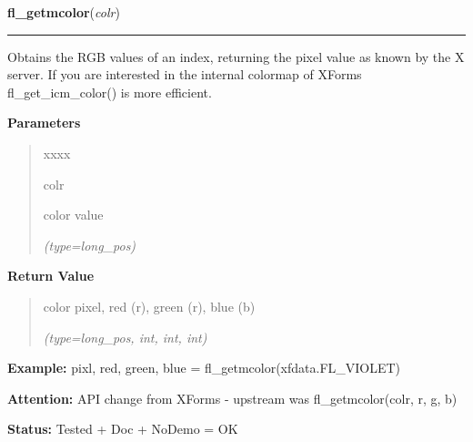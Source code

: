 \hspace{.8\funcindent}\begin{boxedminipage}{\funcwidth}

    \raggedright \textbf{fl\_getmcolor}(\textit{colr})

    \vspace{-1.5ex}

    \rule{\textwidth}{0.5\fboxrule}
\setlength{\parskip}{2ex}
    Obtains the RGB values of an index, returning the pixel value as known 
    by the X server. If you are interested in the internal colormap of 
    XForms fl\_get\_icm\_color() is more efficient.

\setlength{\parskip}{1ex}
      \textbf{Parameters}
      \vspace{-1ex}

      \begin{quote}
        \begin{Ventry}{xxxx}

          \item[colr]

          color value

            {\it (type=long\_pos)}

        \end{Ventry}

      \end{quote}

      \textbf{Return Value}
    \vspace{-1ex}

      \begin{quote}
      color pixel, red (r), green (r), blue (b)

      {\it (type=long\_pos, int, int, int)}

      \end{quote}

\textbf{Example:} pixl, red, green, blue = fl\_getmcolor(xfdata.FL\_VIOLET)



\textbf{Attention:} API change from XForms - upstream was fl\_getmcolor(colr, r, g, b)



\textbf{Status:} Tested + Doc + NoDemo = OK



    \end{boxedminipage}

    \label{xformslib:flbasic:fl_get_pixel}

